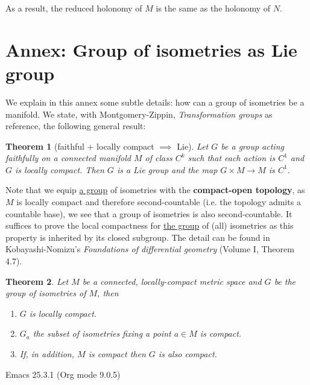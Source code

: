 \documentclass[11pt]{article}
\newtheorem{theorem}{Theorem}
\begin{document}
As a result, the reduced holonomy of \(M\) is the same as the holonomy of \(N\).

\section{Annex: Group of isometries as Lie group}
\label{sec:orga93046c}
We explain in this annex some subtle details: how can a group of isometries be a manifold. We state, with
Montgomery-Zippin, \emph{Transformation groups} as reference, the following general result:

\begin{theorem}[faithful + locally compact $\implies$ Lie]
\label{orgef9ee0b}
Let \(G\) be a group acting faithfully on a connected manifold \(M\) of class \(C^k\) such that each
action is \(C^1\) and \(G\) is locally compact. Then \(G\) is a Lie group and the map \(G\times M\longrightarrow M\) is \(C^1\).
\end{theorem}

Note that we equip \uline{a group} of isometries with the \textbf{compact-open topology}, as \(M\) is locally
 compact and therefore second-countable (i.e. the topology admits a countable base), we see that a
 group of isometries is also second-countable. It suffices to prove the local compactness for \uline{the
 group} of (all) isometries as this property is inherited by its closed subgroup. The detail can be
 found in Kobayashi-Nomizu's \emph{Foundations of differential geometry} (Volume I, Theorem 4.7).

\begin{theorem}
\label{orgd361322}
Let \(M\) be a connected, locally-compact metric space and \(G\) be the group of isometries of
\(M\), then
\begin{enumerate}
\item \(G\) is locally compact.
\item \(G_a\) the subset of isometries fixing a point \(a\in M\) is compact.
\item If, in addition, \(M\) is compact then \(G\) is also compact.
\end{enumerate}
\end{theorem}
Emacs 25.3.1 (Org mode 9.0.5)
\end{document}
